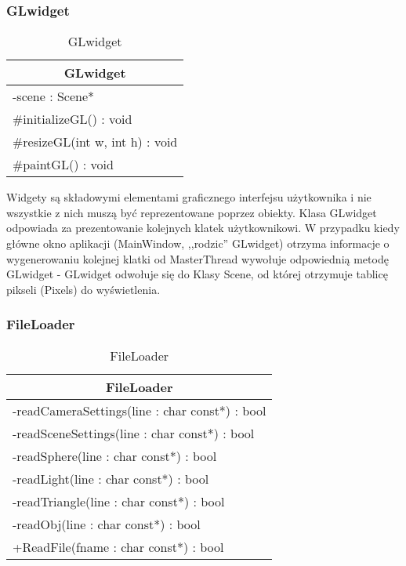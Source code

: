 \subsubsection{GLwidget}

\footnotesize
\begin{longtable}{|p{14cm}|}
    \caption{GLwidget} \label{tab:GLwidget} \\ \hline
    \multicolumn{1}{|c|}{GLwidget} \\ \hline
    -scene : Scene*  \\ \hline
    \#initializeGL() : void \\ 
    \#resizeGL(int w, int h) : void \\
    \#paintGL() : void \\ \hline
\end{longtable}
\normalsize

Widgety są składowymi elementami graficznego interfejsu użytkownika i nie wszystkie z nich muszą być reprezentowane poprzez obiekty. Klasa GLwidget odpowiada za prezentowanie kolejnych klatek użytkownikowi. W przypadku kiedy główne okno aplikacji (MainWindow, ,,rodzic'' GLwidget) otrzyma informacje o wygenerowaniu kolejnej klatki od MasterThread wywołuje odpowiednią metodę GLwidget - GLwidget odwołuje się do Klasy Scene, od której otrzymuje tablicę pikseli (Pixels) do wyświetlenia. 
\pagebreak

\subsubsection{FileLoader}

\footnotesize
\begin{longtable}{|p{14cm}|}
    \caption{FileLoader} \label{tab:FileLoader} \\ \hline
    \multicolumn{1}{|c|}{FileLoader} \\ \hline
    -readCameraSettings(line : char const*) : bool \\
    -readSceneSettings(line : char const*) : bool \\
    -readSphere(line : char const*) : bool \\
    -readLight(line : char const*) : bool \\
    -readTriangle(line : char const*) : bool \\
    -readObj(line : char const*) : bool \\
	+ReadFile(fname : char const*) : bool \\ \hline
\end{longtable}
\normalsize

